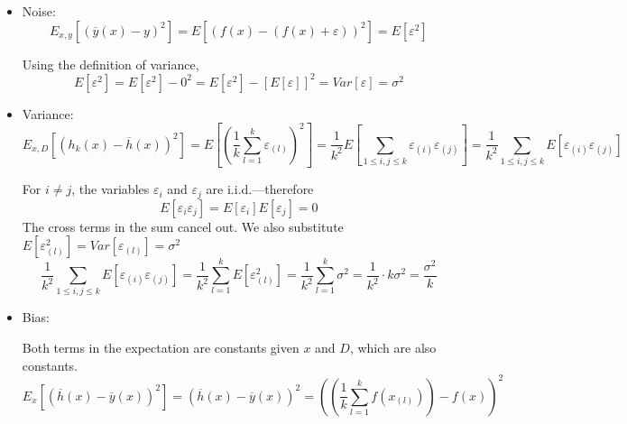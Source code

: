 \documentclass{article}
\begin{document}
    \begin{itemize}
        \item Noise:
        $$E_{x, y}\left[\left(\overline{y}(x) - y\right)^{2}\right] = E\left[\left(f(x) - (f(x)+\varepsilon)\right)^{2}\right] = E\left[\varepsilon^{2}\right]$$
        
        Using the definition of variance,
        $$E\left[\varepsilon^2\right] = E\left[\varepsilon^2\right] - 0^2 = E\left[\varepsilon^2\right] - \left[E\left[\varepsilon\right]\right]^2 = Var[\varepsilon] = \sigma^2$$
        
        \item Variance:
        $$E_{x, D}\left[\left(h_{k}(x) - \overline{h}(x)\right)^{2}\right]=E\left[\left(\frac{1}{k}\sum_{l=1}^{k}\varepsilon_{(l)}\right)^{2}\right]=\frac{1}{k^2}E\left[\sum_{1\leq i,j\leq k}\varepsilon_{(i)}\varepsilon_{(j)}\right]=\frac{1}{k^2}\sum_{1\leq i,j\leq k}E\left[\varepsilon_{(i)}\varepsilon_{(j)}\right]$$
        
        For $i\neq j$, the variables $\varepsilon_i$ and $\varepsilon_j$ are i.i.d.---therefore
        $$E\left[\varepsilon_i\varepsilon_j\right] = E\left[\varepsilon_i\right]E\left[\varepsilon_j\right]=0$$
        The cross terms in the sum cancel out. We also substitute $E\left[\varepsilon_{(l)}^2\right]=Var[\varepsilon_{(l)}]=\sigma^2$
        $$\frac{1}{k^2}\sum_{1\leq i,j\leq k}E\left[\varepsilon_{(i)}\varepsilon_{(j)}\right]= \frac{1}{k^2}\sum_{l=1}^{k}E\left[\varepsilon_{(l)}^2\right] = \frac{1}{k^2}\sum_{l=1}^{k}\sigma^2 = \frac{1}{k^2}\cdot k\sigma^2 = \frac{\sigma^2}{k}$$
    
        \item Bias:
        
        Both terms in the expectation are constants given $x$ and $D$, which are also constants.
        $$E_{x}\left[\left(\overline{h}(x) - \overline{y}(x)\right)^{2}\right] = \left(\overline{h}(x) - \overline{y}(x)\right)^{2}=\left(\left(\frac{1}{k}\sum_{l=1}^{k}f(x_{(l)})\right) - f(x)\right)^{2}$$
    \end{itemize}
\end{document}
